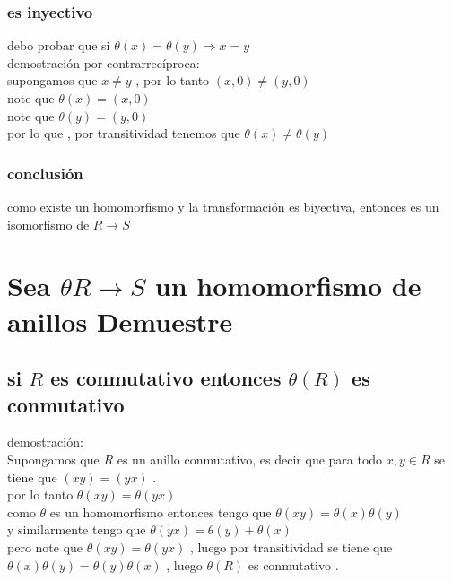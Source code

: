 \documentclass[10pt,a4paper]{article} %
\begin{document}
                \subsubsection{es inyectivo}
                    debo probar que si $ \theta (x) = \theta (y) \Rightarrow x = y  $
                    \\
                    demostración por contrarrecíproca:
                    \\
                    supongamos que $ x \not= y   $  , por lo tanto $ (x,0) \not= (y,0)  $
                    \\
                    note que $ \theta (x) = (x,0)  $
                    \\
                    note que $ \theta (y) = (y,0)  $
                    \\
                    por lo que , por transitividad tenemos que $ \theta (x) \not=
                    \theta (y)  $

                \subsubsection{conclusión}
                    como existe un homomorfismo y la transformación es
                    biyectiva, entonces es un isomorfismo de $ R \to S  $


    \section{Sea $ \theta R \to S  $  un homomorfismo de anillos Demuestre }

        \subsection{si $ R  $ es conmutativo entonces $ \theta (R)  $ es
        conmutativo}

            demostración:
            \\
            Supongamos que $ R  $ es un anillo conmutativo, es decir que para
            todo $ x,y \in R  $  se tiene que $ (xy) = (yx)  $ .
            \\
            por lo tanto $ \theta (xy) = \theta (yx)  $
            \\
            como $ \theta   $ es un homomorfismo entonces tengo que $ \theta
            (xy)  = \theta (x) \theta (y) $
            \\
            y similarmente tengo que $ \theta (yx) = \theta(y) + \theta (x)   $
            \\
            pero note que $ \theta (xy) = \theta (yx)  $  , luego por
            transitividad se tiene que $ \theta (x) \theta (y) = \theta (y)
            \theta (x) $ , luego $ \theta (R)  $  es conmutativo .
\end{document}
